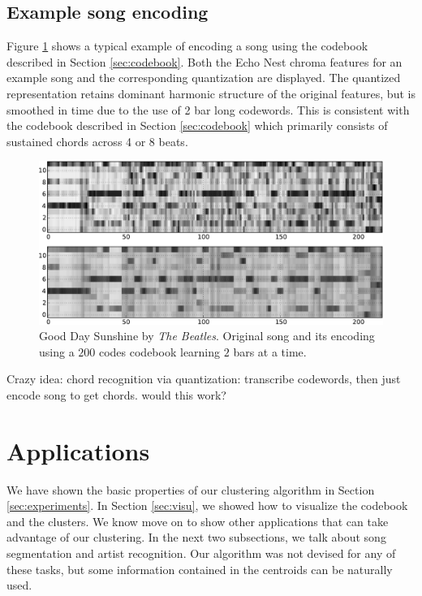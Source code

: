 \documentclass{article}
\begin{document}
\subsection{Example song encoding}

Figure \ref{fig:encodesong} shows a typical example of encoding a song
using the codebook described in Section \ref{sec:codebook}.  Both the
Echo Nest chroma features for an example song and the corresponding
quantization are displayed.  The quantized representation retains
dominant harmonic structure of the original features, but is smoothed
in time due to the use of 2 bar long codewords.
%
This is consistent with the codebook described in Section
\ref{sec:codebook} which primarily consists of sustained chords across
4 or 8 beats.

\begin{figure}[htb]
\begin{center}
\includegraphics[width=.9\columnwidth]{song_encoded}
\end{center}
\caption{\small{Good Day Sunshine by \textit{The Beatles}.
Original song and its encoding using a $200$ codes codebook learning
$2$ bars at a time.
}}
\label{fig:encodesong}
\end{figure}

Crazy idea: chord recognition via quantization: transcribe codewords,
then just encode song to get chords. would this work?



\section{Applications}\label{sec:exps2}
We have shown the basic properties of our clustering algorithm in
Section \ref{sec:experiments}. In Section \ref{sec:visu}, we showed
how to visualize the codebook and the clusters. We know move on to
show other applications that can take advantage of our clustering.
In the next two subsections, we talk about song segmentation and
artist recognition. Our algorithm was not devised for any of these tasks,
but some information contained in the centroids can be naturally used.
\end{document}
